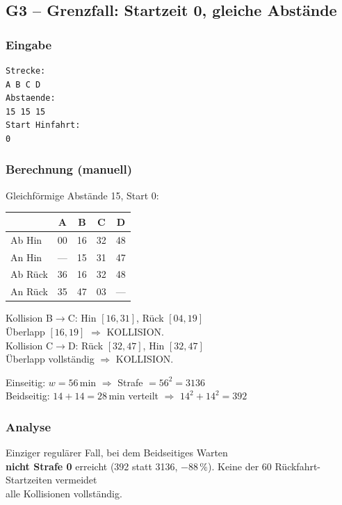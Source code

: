 \documentclass[12pt,a4paper]{article}
\begin{document}
\subsection{G3 – Grenzfall: Startzeit 0, gleiche Abstände}
\label{test:g3}

\noindent
\begin{minipage}[t]{0.48\textwidth}
\scriptsize
\setlength{\tabcolsep}{2pt}

\subsubsection*{Eingabe}
\begin{lstlisting}
Strecke:
A B C D
Abstaende:
15 15 15
Start Hinfahrt:
0
\end{lstlisting}

\subsubsection*{Berechnung (manuell)}
Gleichförmige Abstände 15, Start 0:\\[2pt]
\begin{tabular}{l|cccc}
\toprule
 & \textbf{A} & \textbf{B} & \textbf{C} & \textbf{D}\\
\midrule
Ab Hin  & 00 & 16 & 32 & 48\\
An Hin  & —  & 15 & 31 & 47\\
\midrule
Ab Rück & 36 & 16 & 32 & 48\\
An Rück & 35 & 47 & 03 & —\\
\bottomrule
\end{tabular}

\vspace{4pt}
Kollision B$\to$C: Hin $[16,31]$, Rück $[04,19]$\\
Überlapp $[16,19]$ $\Rightarrow$ KOLLISION.\\
Kollision C$\to$D: Rück $[32,47]$, Hin $[32,47]$\\
Überlapp vollständig $\Rightarrow$ KOLLISION.

\vspace{4pt}
Einseitig: $w = 56$\,min $\Rightarrow$ Strafe $= 56^2 = 3136$\\
Beidseitig: $14+14 = 28$\,min verteilt $\Rightarrow$ $14^2+14^2 = 392$

\subsubsection*{Analyse}
Einziger regulärer Fall, bei dem Beidseitiges Warten\\
\textbf{nicht Strafe 0} erreicht (392 statt 3136, $-88\,\%$).
Keine der 60 Rückfahrt-Startzeiten vermeidet\\
alle Kollisionen vollständig.
\end{minipage}
\end{document}
